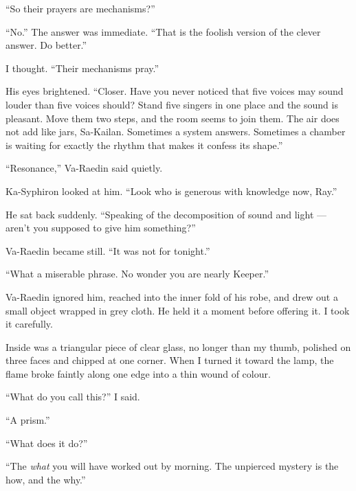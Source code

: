 ``So their prayers are mechanisms?''\par

``No.'' The answer was immediate. ``That is the foolish version of the clever answer. Do better.''\par

I thought. ``Their mechanisms pray.''\par

His eyes brightened. ``Closer.
Have you never noticed that five voices may sound louder than five voices should? Stand five singers in one place and the sound is pleasant. Move them two steps, and the room seems to join them.
The air does not add like jars, Sa-Kailan. Sometimes a system answers. Sometimes a chamber is waiting for exactly the rhythm that makes it confess its shape.''\par

``Resonance,'' Va-Raedin said quietly.\par

Ka-Syphiron looked at him. ``Look who is generous with knowledge now, Ray.''\par


He sat back suddenly. ``Speaking of the decomposition of sound and light --- aren't you supposed to give him something?''\par

Va-Raedin became still. ``It was not for tonight.''\par

``What a miserable phrase. No wonder you are nearly Keeper.''\par

Va-Raedin ignored him, reached into the inner fold of his robe, and drew out a small object wrapped in grey cloth. He held it a moment before offering it.
I took it carefully.\par

Inside was a triangular piece of clear glass, no longer than my thumb, polished on three faces and chipped at one corner.
When I turned it toward the lamp, the flame broke faintly along one edge into a thin wound of colour.\par

``What do you call this?'' I said.\par

``A prism.''\par

``What does it do?''\par

``The \emph{what} you will have worked out by morning. The unpierced mystery is the how, and the why.''\par

